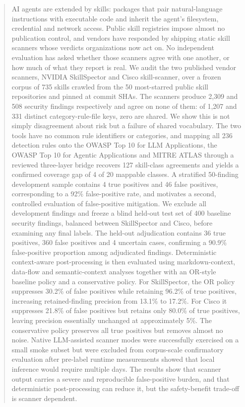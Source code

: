 \documentclass[conference]{IEEEtran}
\begin{document}
\begin{abstract}
AI agents are extended by skills: packages that pair natural-language instructions with executable code and inherit the agent's filesystem, credential and network access. Public skill registries impose almost no publication control, and vendors have responded by shipping static skill scanners whose verdicts organizations now act on. No independent evaluation has asked whether those scanners agree with one another, or how much of what they report is real. We audit the two published vendor scanners, NVIDIA SkillSpector and Cisco skill-scanner, over a frozen corpus of 735 skills crawled from the 50 most-starred public skill repositories and pinned at commit SHAs. The scanners produce 2,309 and 508 security findings respectively and agree on none of them: of 1,207 and 331 distinct category-rule-file keys, zero are shared. We show this is not simply disagreement about risk but a failure of shared vocabulary. The two tools have no common rule identifiers or categories, and mapping all 236 detection rules onto the OWASP Top 10 for LLM Applications, the OWASP Top 10 for Agentic Applications and MITRE ATLAS through a reviewed three-layer bridge recovers 127 skill-class agreements and yields a confirmed coverage gap of 4 of 20 mappable classes. A stratified 50-finding development sample contains 4 true positives and 46 false positives, corresponding to a 92\% false-positive rate, and motivates a second, controlled evaluation of false-positive mitigation. We exclude all development findings and freeze a blind held-out test set of 400 baseline security findings, balanced between SkillSpector and Cisco, before examining any final labels. The held-out adjudication contains 36 true positives, 360 false positives and 4 uncertain cases, confirming a 90.9\% false-positive proportion among adjudicated findings. Deterministic context-aware post-processing is then evaluated using markdown-context, data-flow and semantic-context analyses together with an OR-style baseline policy and a conservative policy. For SkillSpector, the OR policy suppresses 30.2\% of false positives while retaining 96.2\% of true positives, increasing retained-finding precision from 13.1\% to 17.2\%. For Cisco it suppresses 21.8\% of false positives but retains only 80.0\% of true positives, leaving precision essentially unchanged at approximately 5\%. The conservative policy preserves all true positives but removes almost no noise. Native LLM-assisted scanner modes were successfully exercised on a small smoke subset but were excluded from corpus-scale confirmatory evaluation after pre-label runtime measurements showed that local inference would require multiple days. The results show that scanner output carries a severe and reproducible false-positive burden, and that deterministic post-processing can reduce it, but the safety-benefit trade-off is scanner dependent.
\end{abstract}
\end{document}
